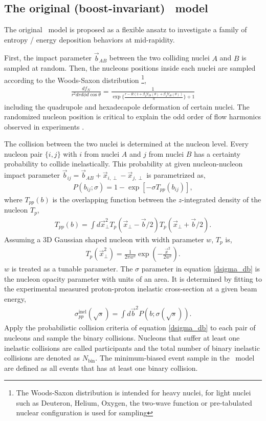 \subsection{The original (boost-invariant) \trento\ model}
The original \trento\ model is proposed as a flexible ansatz to investigate a family of entropy / energy deposition behaviors at mid-rapidity.

First, the impact parameter $\vec{b}_{AB}$ between the two colliding nuclei $A$ and $B$ is sampled at random.
Then, the nucleons positions inside each nuclei are sampled according to the Woods-Saxon distribution \footnote{The Woods-Saxon distribution is intended for heavy nuclei, for light nuclei such as Deuteron, Helium, Oxygen, the two-wave function or pre-tabulated nuclear configuration is used for sampling},
\begin{eqnarray}
\frac{df_N}{r^2 dr d\phi d\cos\theta} = \frac{1}{\exp\{\frac{r-R(1+\beta_2 Y_{20}(\theta)+\beta_4 Y_{40}(\theta))}{a}\}+1}
\end{eqnarray}
including the quadrupole and hexadecapole deformation of certain nuclei.
The randomized nucleon position is critical to explain the odd order of flow harmonics observed in experiments \cite{Alver:2010gr}.

The collision between the two nuclei is determined at the nucleon level. 
Every nucleon pair $\{i, j\}$ with $i$ from nuclei $A$ and $j$ from nuclei $B$ has a certainty probability to collide inelastically.
This probability at given nucleon-nucleon impact parameter $\vec{b}_{ij} = \vec{b}_{AB} + \vec{x}_{i, \perp} -  \vec{x}_{j, \perp}$ is parametrized as,
\begin{eqnarray}
P(b_{ij}; \sigma) = 1 - \exp\left[-\sigma T_{pp}(b_{ij})\right],
\label{dsigma_db}
\end{eqnarray}
where $T_{pp}(b)$ is the overlapping function between the $z$-integrated density of the nucleon $T_p$,
\begin{eqnarray}
T_{pp}(b) = \int d\vec{x}_\perp^2 T_p(\vec{x}_\perp-\vec{b}/2) T_p(\vec{x}_\perp+\vec{b}/2).
\end{eqnarray}
Assuming a 3D Gaussian shaped nucleon with width parameter $w$, $T_p$ is, 
\begin{eqnarray}
T_p(\vec{x}_\perp^2) = \frac{1}{2\pi w^2} \exp\left(-\frac{\vec{x}^2}{2w^2}\right).
\end{eqnarray}
$w$ is treated as a tunable parameter.
The $\sigma$ parameter in equation \ref{dsigma_db} is the nucleon opacity parameter with units of an area.
It is determined by fitting to the experimental measured proton-proton inelastic cross-section at a given beam energy,
\begin{eqnarray}
\sigma_{pp}^\text{inel}(\sqrt{s}) = \int d\vec{b}^2 P(b; \sigma(\sqrt{s})).
\end{eqnarray}
Apply the probabilistic collision criteria of equation \ref{dsigma_db} to each pair of nucleons and sample the binary collisions. 
Nucleons that suffer at least one inelastic collisions are called participants and the total number of binary inelastic collisions are denoted as $N_{\textrm{bin}}$.
The minimum-biased event sample in the \trento\ model are defined as all events that has at least one binary collision.

